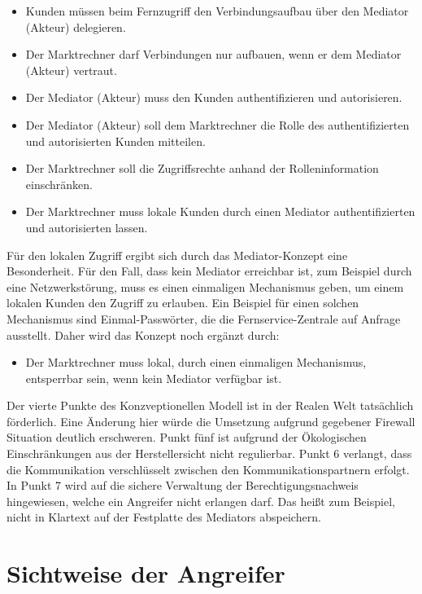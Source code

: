 \documentclass[11pt,a4paper]{report}
\begin{document}
\begin{itemize}[leftmargin=*]
\item Kunden müssen beim Fernzugriff den Verbindungsaufbau über den Mediator (Akteur) delegieren.
\item Der Marktrechner darf Verbindungen nur aufbauen, wenn er dem Mediator (Akteur) vertraut.
\item Der Mediator (Akteur) muss den Kunden authentifizieren und autorisieren.
\item Der Mediator (Akteur) soll dem Marktrechner die Rolle des authentifizierten und autorisierten Kunden mitteilen.
\item Der Marktrechner soll die Zugriffsrechte anhand der Rolleninformation einschränken.
\item Der Marktrechner muss lokale Kunden durch einen Mediator authentifizierten und autorisierten lassen.
\end{itemize}

Für den lokalen Zugriff ergibt sich durch das Mediator-Konzept eine Besonderheit. Für den Fall, dass kein Mediator erreichbar ist, zum Beispiel durch eine Netzwerkstörung, muss es einen einmaligen Mechanismus geben, um einem lokalen Kunden den Zugriff zu erlauben. Ein Beispiel für einen solchen Mechanismus sind Einmal-Passwörter, die die Fernservice-Zentrale auf Anfrage ausstellt. Daher wird das Konzept noch ergänzt durch:

\begin{itemize}[leftmargin=*]
\item Der Marktrechner muss lokal, durch einen einmaligen Mechanismus, entsperrbar sein, wenn kein Mediator verfügbar ist.
\end{itemize}

Der vierte Punkte des Konzveptionellen Modell ist in der Realen Welt tatsächlich förderlich. Eine Änderung hier würde die Umsetzung aufgrund gegebener Firewall Situation deutlich erschweren. Punkt fünf ist aufgrund der Ökologischen Einschränkungen aus der Herstellersicht nicht regulierbar. Punkt 6 verlangt, dass die Kommunikation verschlüsselt zwischen den Kommunikationspartnern erfolgt. In Punkt 7 wird auf die sichere Verwaltung der Berechtigungsnachweis hingewiesen, welche ein Angreifer nicht erlangen darf. Das heißt zum Beispiel, nicht in Klartext auf der Festplatte des Mediators abspeichern.

\section{Sichtweise der Angreifer}
\end{document}
